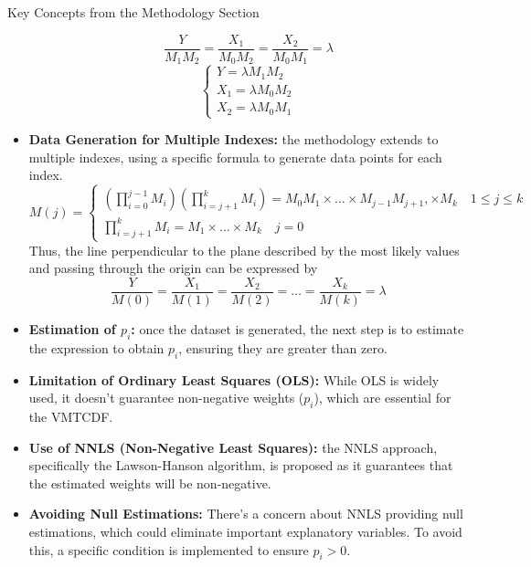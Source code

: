 \documentclass{beamer}
\begin{document}
\begin{frame}[allowframebreaks]{Key Concepts from the Methodology Section}
\begin{itemize}
       	\begin{equation}
       		\frac{Y}{M_{1}M_{2}} = \frac{X_{1}}{M_{0}M_{2}} = \frac{X_{2}}{M_{0}M_{1}} = \lambda
       	\end{equation}
        \begin{equation}
           \begin{cases}
           	    Y = \lambda M_{1} M_{2} \\
               	X_{1} = \lambda M_{0} M_{2} \\
              	X_{2} = \lambda M_{0} M_{1}
           \end{cases}
        \end{equation}
       	\item \textbf{Data Generation for Multiple Indexes:} the methodology extends to multiple indexes, using a specific formula to generate data points for each index.
        	\footnotesize
       	\begin{equation}
       		M(j) = 
       		\begin{cases}
       			\left(\prod_{i=0}^{j-1} M_{i} \right) \left(\prod_{i=j+1}^{k} M_{i} \right) = M_{0}M_{1} \times \ldots \times M_{j-1} M_{j+1}, \times M_{k} \quad 1 \leq j \leq k \\
       			\prod_{i=j+1}^{k} M_{i} = M_{1} \times \ldots \times M_{k} \quad j=0
       		\end{cases}
       	\end{equation}
        \normalsize
        Thus, the line perpendicular to the plane described by the most likely values and passing through the origin can be expressed by
        \begin{equation}
        	\frac{Y}{M(0)} = \frac{X_{1}}{M(1)} = \frac{X_{2}}{M(2)} = \ldots = \frac{X_{k}}{M(k)} = \lambda
        \end{equation}
       	\item \textbf{Estimation of \(p_{i}\):} once the dataset is generated, the next step is to estimate the expression to obtain \(p_{i}\), ensuring they are greater than zero.
       	\item \textbf{Limitation of Ordinary Least Squares (OLS):} While OLS is widely used, it doesn't guarantee non-negative weights (\(p_{i}\)), which are essential for the VMTCDF.
       	\item \textbf{Use of NNLS (Non-Negative Least Squares):} the NNLS approach, specifically the Lawson-Hanson algorithm, is proposed as it guarantees that the estimated weights will be non-negative.
       	\item \textbf{Avoiding Null Estimations:} There's a concern about NNLS providing null estimations, which could eliminate important explanatory variables. To avoid this, a specific condition is implemented to ensure \(p_{i} > 0\).

\end{itemize}
\end{frame}
\end{document}
